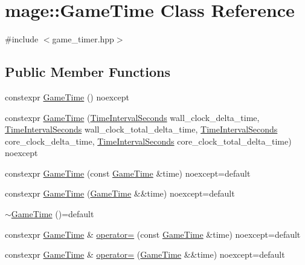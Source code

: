 \hypertarget{classmage_1_1_game_time}{}\section{mage\+:\+:Game\+Time Class Reference}
\label{classmage_1_1_game_time}


{\ttfamily \#include $<$game\+\_\+timer.\+hpp$>$}

\subsection*{Public Member Functions}
\begin{DoxyCompactItemize}
\item 
constexpr \mbox{\hyperlink{classmage_1_1_game_time_af39a4fbd42467249874ba9372f463552}{Game\+Time}} () noexcept
\item 
constexpr \mbox{\hyperlink{classmage_1_1_game_time_a1a5b31bbb76199507b17217099c796d4}{Game\+Time}} (\mbox{\hyperlink{namespacemage_a21c3d1575018d1e0720948713c76be1f}{Time\+Interval\+Seconds}} wall\+\_\+clock\+\_\+delta\+\_\+time, \mbox{\hyperlink{namespacemage_a21c3d1575018d1e0720948713c76be1f}{Time\+Interval\+Seconds}} wall\+\_\+clock\+\_\+total\+\_\+delta\+\_\+time, \mbox{\hyperlink{namespacemage_a21c3d1575018d1e0720948713c76be1f}{Time\+Interval\+Seconds}} core\+\_\+clock\+\_\+delta\+\_\+time, \mbox{\hyperlink{namespacemage_a21c3d1575018d1e0720948713c76be1f}{Time\+Interval\+Seconds}} core\+\_\+clock\+\_\+total\+\_\+delta\+\_\+time) noexcept
\item 
constexpr \mbox{\hyperlink{classmage_1_1_game_time_a7af065c229b72b1daa5a8f6cc6553ede}{Game\+Time}} (const \mbox{\hyperlink{classmage_1_1_game_time}{Game\+Time}} \&time) noexcept=default
\item 
constexpr \mbox{\hyperlink{classmage_1_1_game_time_a87dd026fe0c83aee86c39e4c40e641fb}{Game\+Time}} (\mbox{\hyperlink{classmage_1_1_game_time}{Game\+Time}} \&\&time) noexcept=default
\item 
\mbox{\hyperlink{classmage_1_1_game_time_ae7a709bde27a737be9ebed2a92e00c8b}{$\sim$\+Game\+Time}} ()=default
\item 
constexpr \mbox{\hyperlink{classmage_1_1_game_time}{Game\+Time}} \& \mbox{\hyperlink{classmage_1_1_game_time_a7ebc520cb69228e457c24958e7b97baa}{operator=}} (const \mbox{\hyperlink{classmage_1_1_game_time}{Game\+Time}} \&time) noexcept=default
\item 
constexpr \mbox{\hyperlink{classmage_1_1_game_time}{Game\+Time}} \& \mbox{\hyperlink{classmage_1_1_game_time_a79756019f21b5125114483ddc71247fe}{operator=}} (\mbox{\hyperlink{classmage_1_1_game_time}{Game\+Time}} \&\&time) noexcept=default

\end{DoxyCompactItemize}
